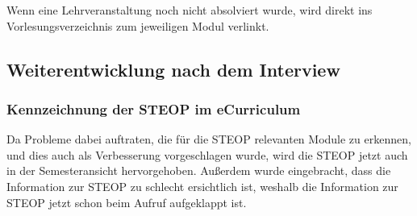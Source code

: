\documentclass[a4paper,10pt]{scrartcl}
\begin{document}
Wenn eine Lehrveranstaltung noch nicht absolviert wurde, wird direkt ins Vorlesungsverzeichnis zum jeweiligen Modul verlinkt.

\noindent{}
\medskip

\subsection{Weiterentwicklung nach dem Interview}

\subsubsection*{Kennzeichnung der STEOP im eCurriculum}

Da Probleme dabei auftraten, die für die STEOP relevanten Module zu erkennen, und dies auch als Verbesserung vorgeschlagen wurde, wird die STEOP jetzt auch in der
Semesteransicht hervorgehoben. Außerdem wurde eingebracht, dass die Information zur STEOP zu schlecht ersichtlich ist, weshalb die Information zur STEOP jetzt
schon beim Aufruf aufgeklappt ist.

\noindent{}
\medskip
\end{document}
